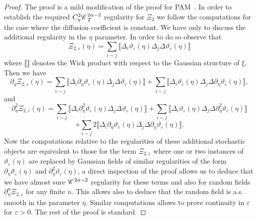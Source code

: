 \documentclass[11pt,reqno]{amsart}
\newcommand{\CC}{\mathscr{C} \hspace{.1em}}
\begin{document}
\begin{proof}
  The proof is a mild modification of the proof for
  PAM~{\cite{gubinelli_paracontrolled_2015}}. In order to establish the
  required $C^2_{\eta} \CC^{2 \alpha - 2}_T$ regularity for $\Xi_2$ we follow
  the computations for the case where the diffusion coefficient is constant.
  We have only to discuss the additional regularity in the $\eta$ parameter.
  In order to do so observe that
  \[ \Xi_{2, \varepsilon} (\eta) = \sum_{i \sim j} \llbracket \Delta_i
     \vartheta_{\varepsilon} (\eta) \Delta_j \Delta \vartheta_{\varepsilon}
     (\eta) \rrbracket \]
  where $\llbracket \rrbracket$ denotes the Wick product with respect to the
  Gaussian structure of $\xi$. Then we have
  \[ \partial_{\eta} \Xi_{2, \varepsilon} (\eta) = \sum_{i \sim j} \llbracket
     \Delta_i \partial_{\eta} \vartheta_{\varepsilon} (\eta) \Delta_j \Delta
     \vartheta_{\varepsilon} (\eta) \rrbracket + \sum_{i \sim j} \llbracket
     \Delta_i \vartheta_{\varepsilon} (\eta) \Delta_j \Delta \partial_{\eta}
     \vartheta_{\varepsilon} (\eta) \rrbracket, \]
  and
  \[ \partial_{\eta}^2 \Xi_{2, \varepsilon} (\eta) = \sum_{i \sim j}
     \llbracket \Delta_i \partial_{\eta}^2 \vartheta_{\varepsilon} (\eta)
     \Delta_j \Delta \vartheta_{\varepsilon} (\eta) \rrbracket + \sum_{i \sim
     j} \llbracket \Delta_i \vartheta_{\varepsilon} (\eta) \Delta_j \Delta
     \partial_{\eta}^2 \vartheta_{\varepsilon} (\eta) \rrbracket \]
  \[ + \sum_{i \sim j} 2 \llbracket \Delta_i \partial_{\eta}
     \vartheta_{\varepsilon} (\eta) \Delta_j \Delta \partial_{\eta}
     \vartheta_{\varepsilon} (\eta) \rrbracket . \]
  Now the computations relative to the regularities of these additional
  stochastic objects are equivalent to those for the term $\Xi_{2,
  \varepsilon}$ where one or two instances of $\vartheta_{\varepsilon} (\eta)$
  are replaced by Gaussian fields of similar regularities of the form
  $\partial_{\eta} \vartheta_{\varepsilon} (\eta)$ and $\partial_{\eta}^2
  \vartheta_{\varepsilon} (\eta)$, a direct inspection of the proof allows us
  to deduce that we have almost sure $\CC^{2 \alpha - 2}$ regularity for these
  terms and also for random fields $\partial_{\eta}^n \Xi_{2, \varepsilon}$
  for any finite $n$. This allows also to deduce that the random field is a.s.
  smooth in the parameter $\eta$. Similar computations allows to prove
  continuity in $\varepsilon$ for $\varepsilon > 0$. The rest of the proof is
  standard.
\end{proof}
\end{document}
